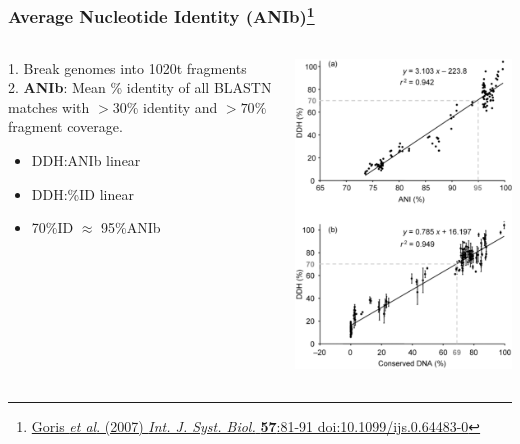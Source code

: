 \begin{frame}
  \frametitle{Average Nucleotide Identity (ANIb)\footnote{\tiny{\href{http://dx.doi.org/10.1099/ijs.0.64483-0}{Goris \textit{et al}. (2007) \textit{Int. J. Syst. Biol.} \textbf{57}:81-91 doi:10.1099/ijs.0.64483-0}}}}
  \begin{columns}[T]
    \begin{column}{5cm}
      1. Break genomes into 1020t fragments\\
      2. \textbf{ANIb}: Mean \% identity of all BLASTN matches with $>30\%$ identity and $>70\%$ fragment coverage.\\[0.5cm]
      \begin{itemize}
        \item DDH:ANIb linear
        \item DDH:\%ID linear
        \item 70\%ID $\approx$ 95\%ANIb
      \end{itemize}
    \end{column}
    \begin{column}{5cm}
      \includegraphics[width=1\textwidth]{images/ddh_ani_pid}
    \end{column}
  \end{columns}
\end{frame}

